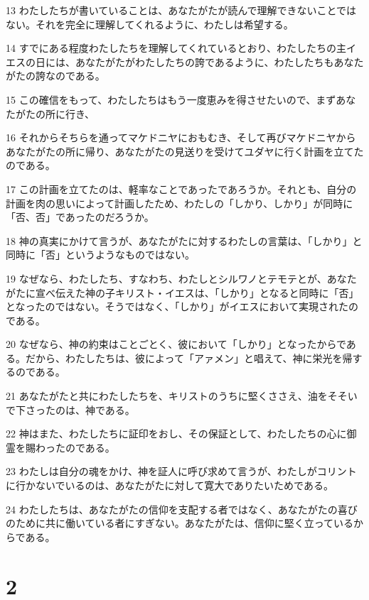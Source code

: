 \par 13 わたしたちが書いていることは、あなたがたが読んで理解できないことではない。それを完全に理解してくれるように、わたしは希望する。
\par 14 すでにある程度わたしたちを理解してくれているとおり、わたしたちの主イエスの日には、あなたがたがわたしたちの誇であるように、わたしたちもあなたがたの誇なのである。
\par 15 この確信をもって、わたしたちはもう一度恵みを得させたいので、まずあなたがたの所に行き、
\par 16 それからそちらを通ってマケドニヤにおもむき、そして再びマケドニヤからあなたがたの所に帰り、あなたがたの見送りを受けてユダヤに行く計画を立てたのである。
\par 17 この計画を立てたのは、軽率なことであったであろうか。それとも、自分の計画を肉の思いによって計画したため、わたしの「しかり、しかり」が同時に「否、否」であったのだろうか。
\par 18 神の真実にかけて言うが、あなたがたに対するわたしの言葉は、「しかり」と同時に「否」というようなものではない。
\par 19 なぜなら、わたしたち、すなわち、わたしとシルワノとテモテとが、あなたがたに宣べ伝えた神の子キリスト・イエスは、「しかり」となると同時に「否」となったのではない。そうではなく、「しかり」がイエスにおいて実現されたのである。
\par 20 なぜなら、神の約束はことごとく、彼において「しかり」となったからである。だから、わたしたちは、彼によって「アァメン」と唱えて、神に栄光を帰するのである。
\par 21 あなたがたと共にわたしたちを、キリストのうちに堅くささえ、油をそそいで下さったのは、神である。
\par 22 神はまた、わたしたちに証印をおし、その保証として、わたしたちの心に御霊を賜わったのである。
\par 23 わたしは自分の魂をかけ、神を証人に呼び求めて言うが、わたしがコリントに行かないでいるのは、あなたがたに対して寛大でありたいためである。
\par 24 わたしたちは、あなたがたの信仰を支配する者ではなく、あなたがたの喜びのために共に働いている者にすぎない。あなたがたは、信仰に堅く立っているからである。

\chapter{2}

